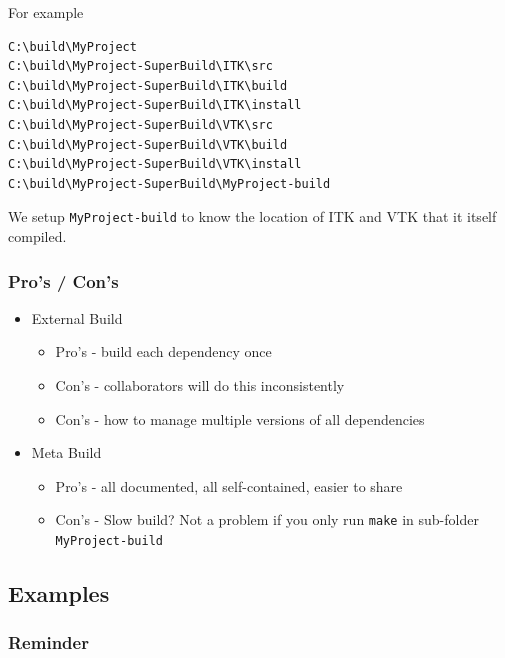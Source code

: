For example

\begin{verbatim}
C:\build\MyProject
C:\build\MyProject-SuperBuild\ITK\src
C:\build\MyProject-SuperBuild\ITK\build
C:\build\MyProject-SuperBuild\ITK\install
C:\build\MyProject-SuperBuild\VTK\src
C:\build\MyProject-SuperBuild\VTK\build
C:\build\MyProject-SuperBuild\VTK\install
C:\build\MyProject-SuperBuild\MyProject-build
\end{verbatim}

We setup \texttt{MyProject-build} to know the location of ITK and VTK
that it itself compiled.

\subsubsection{Pro's / Con's}\label{pros-cons}

\begin{itemize}
\itemsep1pt\parskip0pt
\item
  External Build

  \begin{itemize}
  \itemsep1pt\parskip0pt
  \item
    Pro's - build each dependency once
  \item
    Con's - collaborators will do this inconsistently
  \item
    Con's - how to manage multiple versions of all dependencies
  \end{itemize}
\item
  Meta Build

  \begin{itemize}
  \itemsep1pt\parskip0pt
  \item
    Pro's - all documented, all self-contained, easier to share
  \item
    Con's - Slow build? Not a problem if you only run \texttt{make} in
    sub-folder \texttt{MyProject-build}
  \end{itemize}
\end{itemize}

\subsection{Examples}\label{examples}

\subsubsection{Reminder}\label{reminder}

